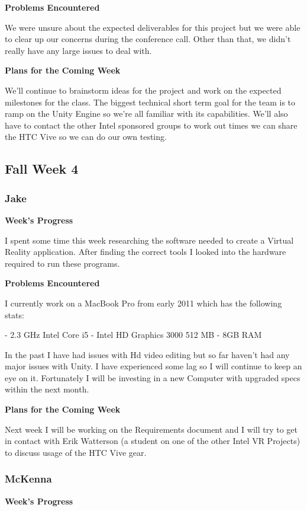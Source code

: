 \documentclass[10pt,journal,compsoc,onecolumn, draftclsnofoot]{IEEEtran}
\begin{document}
\noindent \textbf{Problems Encountered}

We were unsure about the expected deliverables for this project but we were able to clear up our concerns during the conference call. Other than that, we didn't really have any large issues to deal with.

\noindent \textbf{Plans for the Coming Week}

We'll continue to brainstorm ideas for the project and work on the expected milestones for the class. The biggest technical short term goal for the team is to ramp on the Unity Engine so we're all familiar with its capabilities. We'll also have to contact the other Intel sponsored groups to work out times we can share the HTC Vive so we can do our own testing.

\subsection{Fall Week 4}
\subsubsection{Jake}
\noindent \textbf{Week's Progress}

I spent some time this week researching the software needed to create a Virtual Reality application. After finding the correct tools I looked into the hardware required to run these programs.

\noindent \textbf{Problems Encountered}

I currently work on a MacBook Pro from early 2011 which has the following stats:

- 2.3 GHz Intel Core i5
- Intel HD Graphics 3000 512 MB
- 8GB RAM

In the past I have had issues with Hd video editing but so far haven't had any major issues with Unity. I have experienced some lag so I will continue to keep an eye on it. Fortunately I will be investing in a new Computer with upgraded specs within the next month.

\noindent \textbf{Plans for the Coming Week}

Next week I will be working on the Requirements document and I will try to get in contact with Erik Watterson (a student on one of the other Intel VR Projects) to discuss usage of the HTC Vive gear.

\subsubsection{McKenna}
\noindent \textbf{Week's Progress}
\end{document}
